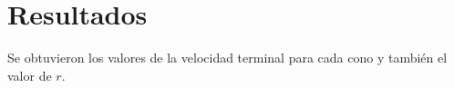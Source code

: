 \section{Resultados}

Se obtuvieron los valores de la velocidad
terminal para cada cono y también el valor de $r$.
